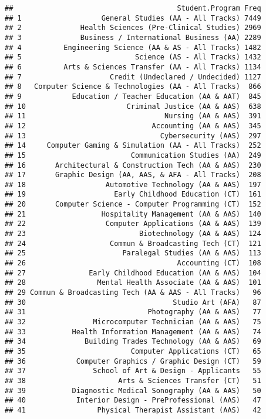 \documentclass[]{article}
\begin{document}
\begin{verbatim}
##                                       Student.Program Freq
## 1                   General Studies (AA - All Tracks) 7449
## 2              Health Sciences (Pre-Clinical Studies) 2969
## 3              Business / International Business (AA) 2289
## 4          Engineering Science (AA & AS - All Tracks) 1482
## 5                           Science (AS - All Tracks) 1432
## 6          Arts & Sciences Transfer (AA - All Tracks) 1134
## 7                     Credit (Undeclared / Undecided) 1127
## 8   Computer Science & Technologies (AA - All Tracks)  866
## 9            Education / Teacher Education (AA & AAT)  845
## 10                        Criminal Justice (AA & AAS)  638
## 11                                 Nursing (AA & AAS)  391
## 12                              Accounting (AA & AAS)  345
## 13                                Cybersecurity (AAS)  297
## 14     Computer Gaming & Simulation (AA - All Tracks)  252
## 15                         Communication Studies (AA)  249
## 16       Architectural & Construction Tech (AA & AAS)  230
## 17       Graphic Design (AA, AAS, & AFA - All Tracks)  208
## 18                   Automotive Technology (AA & AAS)  197
## 19                     Early Childhood Education (CT)  161
## 20       Computer Science - Computer Programming (CT)  152
## 21                  Hospitality Management (AA & AAS)  140
## 22                   Computer Applications (AA & AAS)  139
## 23                           Biotechnology (AA & AAS)  124
## 24                    Commun & Broadcasting Tech (CT)  121
## 25                       Paralegal Studies (AA & AAS)  113
## 26                                    Accounting (CT)  108
## 27               Early Childhood Education (AA & AAS)  104
## 28                 Mental Health Associate (AA & AAS)  101
## 29 Commun & Broadcasting Tech (AA & AAS - All Tracks)   96
## 30                                   Studio Art (AFA)   87
## 31                             Photography (AA & AAS)   77
## 32                Microcomputer Technician (AA & AAS)   75
## 33           Health Information Management (AA & AAS)   74
## 34              Building Trades Technology (AA & AAS)   69
## 35                         Computer Applications (CT)   65
## 36            Computer Graphics / Graphic Design (CT)   59
## 37                School of Art & Design - Applicants   55
## 38                      Arts & Sciences Transfer (CT)   51
## 39           Diagnostic Medical Sonography (AA & AAS)   50
## 40            Interior Design - PreProfessional (AAS)   47
## 41                 Physical Therapist Assistant (AAS)   42

\end{verbatim}
\end{document}
